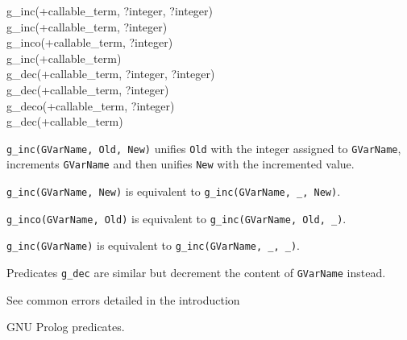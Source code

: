 \begin{TemplatesOneCol}
g\_inc(+callable\_term, ?integer, ?integer) \\
g\_inc(+callable\_term, ?integer) \\
g\_inco(+callable\_term, ?integer) \\
g\_inc(+callable\_term) \\
g\_dec(+callable\_term, ?integer, ?integer) \\
g\_dec(+callable\_term, ?integer) \\
g\_deco(+callable\_term, ?integer) \\
g\_dec(+callable\_term)

\end{TemplatesOneCol}

\Description

\texttt{g\_inc(GVarName, Old, New)} unifies \texttt{Old} with the
integer assigned to \texttt{GVarName}, increments \texttt{GVarName} and
then unifies \texttt{New} with the incremented value.

\texttt{g\_inc(GVarName, New)} is equivalent to
\texttt{g\_inc(GVarName, \_, New)}.

\texttt{g\_inco(GVarName, Old)} is equivalent to
\texttt{g\_inc(GVarName, Old, \_)}.

\texttt{g\_inc(GVarName)} is equivalent to \texttt{g\_inc(GVarName, \_, \_)}.

Predicates \texttt{g\_dec} are similar but decrement the content of
\texttt{GVarName} instead.

\Errors

See common errors detailed in the introduction 

\begin{PlErrorsNoTitle}





\end{PlErrorsNoTitle}

\Portability

GNU Prolog predicates.

